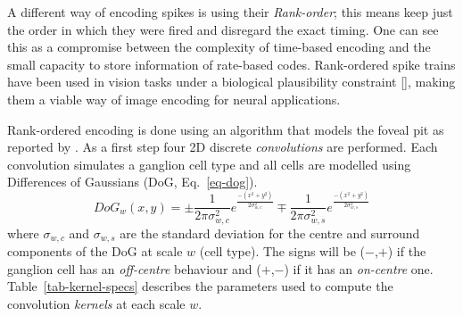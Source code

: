 A different way of encoding spikes is using their \emph{Rank-order}; this means
keep just the order in which they were fired and disregard the exact timing. One
can see this as a compromise between the complexity of time-based encoding and 
the small capacity to store information of rate-based codes. Rank-ordered spike 
trains have been used in vision tasks under a biological plausibility 
constraint [\cite{van-rullen-rate-coding,basab-model}], making them a viable
way of image encoding for neural applications.

Rank-ordered encoding is done using an algorithm that models the foveal pit 
as reported by \cite{basab-model}. As a first step four 2D discrete 
\emph{convolutions} are performed. Each convolution simulates a ganglion cell 
type and all cells are modelled using Differences of Gaussians (DoG, 
Eq.~\ref{eq-dog}). \begin{equation}
\label{eq-dog}
DoG_w(x,y) = \pm\frac{1}{2\pi\sigma_{w,c}^2}e^{\frac{-(x^2 + y^2)}{2\sigma_{w,c}^2}}
\mp\frac{1}{2\pi\sigma_{w,s}^2}e^{\frac{-(x^2 + y^2)}{2\sigma_{w,s}^2}}
\end{equation}
where $\sigma_{w,c}$ and $\sigma_{w,s}$ are the standard deviation for the 
centre and surround components of the DoG at scale $w$ (cell type). The signs 
will be ($-$,$+$) if the ganglion cell has an \emph{off-centre} behaviour and 
($+$,$-$) if it has an \emph{on-centre} one. Table~\ref{tab-kernel-specs} 
describes the parameters used to compute the convolution \emph{kernels} at each 
scale $w$.

